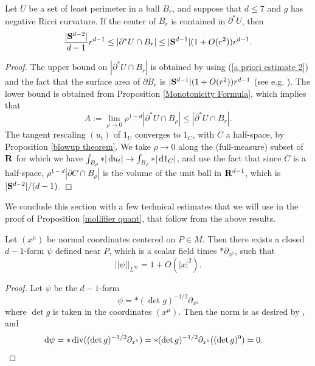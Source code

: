 \begin{proposition}\label{doubling dimension}
Let $U$ be a set of least perimeter in a ball $B_r$, and suppose that $d \leq 7$ and $g$ has negative Ricci curvature.
If the center of $B_r$ is contained in $\partial^* U$, then
$$\frac{|\mathbf S^{d - 2}|}{d - 1} r^{d - 1} \leq |\partial^*U \cap B_r| \leq |\mathbf S^{d - 1}|(1 + O(r^2))r^{d - 1}.$$
\end{proposition}
\begin{proof}
The upper bound on $|\partial^* U \cap B_r|$ is obtained by using (\ref{a priori estimate 2}) and the fact that the surface area of $\partial B_r$ is $|\mathbf S^{d - 1}|(1 + O(r^2))r^{d - 1}$ (see e.g. \cite{gray1974volume}).
The lower bound is obtained from Proposition \ref{Monotonicity Formula}, which implies that
$$A := \lim_{\rho \to 0} \rho^{1 - d} |\partial^* U \cap B_\rho| \leq |\partial^* U \cap B_r|.$$
The tangent rescaling $(u_t)$ of $1_U$ converges to $1_C$, with $C$ a half-space, by Proposition \ref{blowup theorem}.
We take $\rho \to 0$ along the (full-measure) subset of $\mathbf{R}$ for which we have $\int_{B_\rho} *|\mathop{}\!\mathrm{d} u_t| \to \int_{B_\rho} *|\mathop{}\!\mathrm{d} 1_C|$,
and use the fact that since $C$ is a half-space, $\rho^{1-d} |\partial C \cap B_\rho|$ is the volume of the unit ball in $\mathbf{R}^{d - 1}$, which is $|\mathbf S^{d - 2}|/(d - 1)$.
\end{proof}

We conclude this section with a few technical estimates that we will use in the proof of Proposition \ref{mollifier quant}, that follow from the above results.

\begin{lemma}\label{closed 1-form for normal}
Let $(x^\mu)$ be normal coordinates centered on $P \in M$.
Then there exists a closed $d-1$-form $\psi$ defined near $P$, which is a scalar field times $*\partial_{x^1}$, such that
\begin{equation}\label{norm of good d1 form}||\psi||_{L^\infty} = 1 + O(|x|^2).\end{equation}
\end{lemma}
\begin{proof}
Let $\psi$ be the $d-1$-form
$$\psi = *(\det g)^{-1/2} \partial_{x^1}$$
where $\det g$ is taken in the coordinates $(x^\mu)$. Then the norm is as desired by \cite[Lemma 3.4]{schoen1994lectures}, and
\begin{align*}
\mathop{}\!\mathrm{d} \psi &= *\operatorname{div}((\det g)^{-1/2} \partial_{x^1}) = *(\det g)^{-1/2} \partial_{x^1}((\det g)^0) = 0. \qedhere
\end{align*}
\end{proof}

